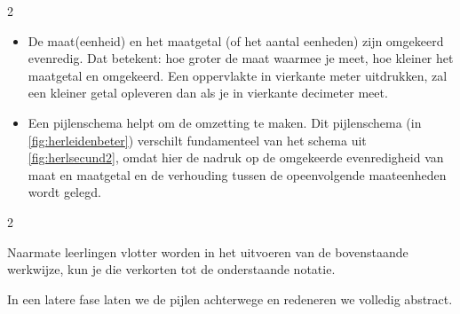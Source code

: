 \begin{multicols}{2}
\begin{itemize}
\item De maat(eenheid) en het maatgetal (of het aantal eenheden) zijn omgekeerd evenredig.
Dat betekent: hoe groter de maat waarmee je meet, hoe kleiner het maatgetal en omgekeerd.
Een oppervlakte in vierkante meter uitdrukken, zal een kleiner getal opleveren dan als je in vierkante decimeter meet.

\item Een pijlenschema helpt om de omzetting te maken.
Dit pijlenschema (in \autoref{fig:herleidenbeter}) verschilt fundamenteel van het schema uit \autoref{fig:herlsecund2}, omdat hier de nadruk op de omgekeerde evenredigheid van maat en maatgetal en de verhouding tussen de opeenvolgende maateenheden wordt gelegd.

\end{itemize}

\end{multicols}





\begin{multicols}{2}
    

Naarmate leerlingen vlotter worden in het uitvoeren van de bovenstaande werkwijze, kun je die verkorten tot de onderstaande notatie.


In een latere fase laten we de pijlen achterwege en redeneren we volledig abstract.

\end{multicols}

